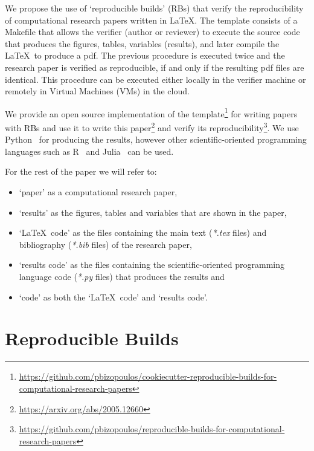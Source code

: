 \documentclass[journal]{IEEEtran}
\begin{document}
We propose the use of `reproducible builds' (RBs) that verify the reproducibility of computational research papers written in \LaTeX.
The template consists of a Makefile that allows the verifier (author or reviewer) to execute the source code that produces the figures, tables, variables (results), and later compile the \LaTeX\ to produce a pdf.
The previous procedure is executed twice and the research paper is verified as reproducible, if and only if the resulting pdf files are identical.
This procedure can be executed either locally in the verifier machine or remotely in Virtual Machines (VMs) in the cloud.

We provide an open source implementation of the template\footnote{\url{https://github.com/pbizopoulos/cookiecutter-reproducible-builds-for-computational-research-papers}} for writing papers with RBs and use it to write this paper\footnote{\url{https://arxiv.org/abs/2005.12660}} and verify its reproducibility\footnote{\url{https://github.com/pbizopoulos/reproducible-builds-for-computational-research-papers}}.
We use Python~\cite{van2007python} for producing the results, however other scientific-oriented programming languages such as R~\cite{ihaka1996r} and Julia~\cite{bezanson2017julia} can be used.

For the rest of the paper we will refer to:
\begin{itemize}
	\item `paper' as a computational research paper,
	\item `results' as the figures, tables and variables that are shown in the paper,
	\item `\LaTeX\ code' as the files containing the main text (\textit{*.tex} files) and bibliography (\textit{*.bib} files) of the research paper,
	\item `results code' as the files containing the scientific-oriented programming language code (\textit{*.py} files) that produces the results and
	\item `code' as both the `\LaTeX\ code' and `results code'.
\end{itemize}

\section{Reproducible Builds}
\end{document}
